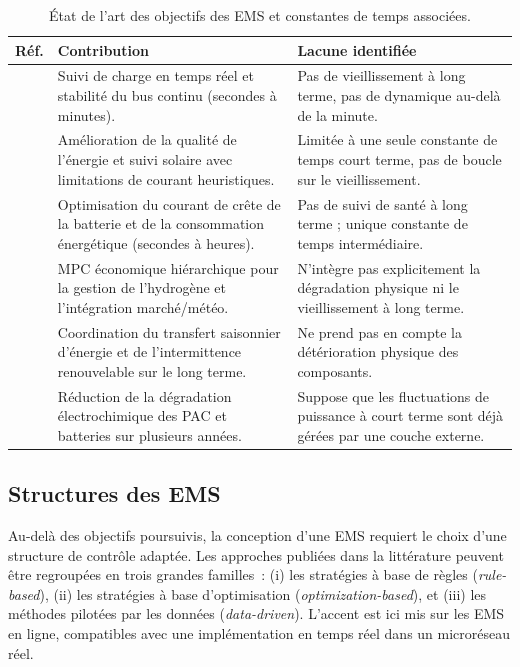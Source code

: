\begin{table}[h!]
\centering
\caption{État de l'art des objectifs des EMS et constantes de temps associées.}
\label{tab:state_of_art_summary}
\begin{tabularx}{\textwidth}{lXX}
\hline
\textbf{Réf.} & \textbf{Contribution} & \textbf{Lacune identifiée} \\ \hline
\cite{hu_data_based_2024} & Suivi de charge en temps réel et stabilité du bus continu (secondes à minutes). & Pas de vieillissement à long terme, pas de dynamique au-delà de la minute. \\ \hline
\cite{asrari_experimental_2025} & Amélioration de la qualité de l'énergie et suivi solaire avec limitations de courant heuristiques. & Limitée à une seule constante de temps court terme, pas de boucle sur le vieillissement. \\ \hline
\cite{paulraj_machine_2025} & Optimisation du courant de crête de la batterie et de la consommation énergétique (secondes à heures). & Pas de suivi de santé à long terme ; unique constante de temps intermédiaire. \\ \hline
\cite{guo_sustainable_2025} & MPC économique hiérarchique pour la gestion de l'hydrogène et l'intégration marché/météo. & N'intègre pas explicitement la dégradation physique ni le vieillissement à long terme. \\ \hline
\cite{qi_long_term_2025} & Coordination du transfert saisonnier d'énergie et de l'intermittence renouvelable sur le long terme. & Ne prend pas en compte la détérioration physique des composants. \\ \hline
\cite{wang_power_2019} & Réduction de la dégradation électrochimique des PAC et batteries sur plusieurs années. & Suppose que les fluctuations de puissance à court terme sont déjà gérées par une couche externe. \\ \hline
\end{tabularx}
\end{table}
\FloatBarrier

\subsection{Structures des EMS}

Au-delà des objectifs poursuivis, la conception d'une EMS requiert le choix d'une structure de contrôle adaptée.
Les approches publiées dans la littérature peuvent être regroupées en trois grandes familles~: (i) les stratégies à base de règles (\textit{rule-based}), (ii) les stratégies à base d'optimisation (\textit{optimization-based}), et (iii) les méthodes pilotées par les données (\textit{data-driven}).
L'accent est ici mis sur les EMS en ligne, compatibles avec une implémentation en temps réel dans un microréseau réel.


